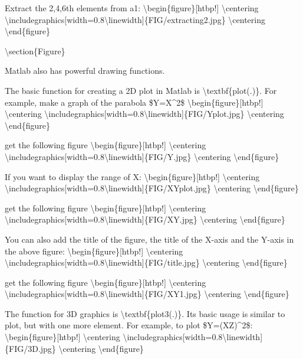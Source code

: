 \documentclass[10pt,math=newtx,citestyle=gb7714-2015,bibstyle=gb7714-2015]{elegantbook}
\begin{document}
	Extract the 2,4,6th elements from a1:
	\textbackslash{}begin\{figure\}[htbp!]
	\textbackslash{}centering
	\textbackslash{}includegraphics[width=0.8\textbackslash{}linewidth]\{FIG/extracting2.jpg\}
	\textbackslash{}centering
	\textbackslash{}end\{figure\}
	
	\textbackslash{}section\{Figure\}
	
	Matlab also has powerful drawing functions.
	
	The basic function for creating a 2D plot in Matlab is \textbackslash{}textbf\{plot(.)\}. For example, make a graph of the parabola \$Y=X\^{}2\$
	\textbackslash{}begin\{figure\}[htbp!]
	\textbackslash{}centering
	\textbackslash{}includegraphics[width=0.8\textbackslash{}linewidth]\{FIG/Yplot.jpg\}
	\textbackslash{}centering
	\textbackslash{}end\{figure\}
	
	get the following figure
	\textbackslash{}begin\{figure\}[htbp!]
	\textbackslash{}centering
	\textbackslash{}includegraphics[width=0.8\textbackslash{}linewidth]\{FIG/Y.jpg\}
	\textbackslash{}centering
	\textbackslash{}end\{figure\}
	
	If you want to display the range of X:
	\textbackslash{}begin\{figure\}[htbp!]
	\textbackslash{}centering
	\textbackslash{}includegraphics[width=0.8\textbackslash{}linewidth]\{FIG/XYplot.jpg\}
	\textbackslash{}centering
	\textbackslash{}end\{figure\}
	
	get the following figure
	\textbackslash{}begin\{figure\}[htbp!]
	\textbackslash{}centering
	\textbackslash{}includegraphics[width=0.8\textbackslash{}linewidth]\{FIG/XY.jpg\}
	\textbackslash{}centering
	\textbackslash{}end\{figure\}
	
	You can also add the title of the figure, the title of the X-axis and the Y-axis in the above figure:
	\textbackslash{}begin\{figure\}[htbp!]
	\textbackslash{}centering
	\textbackslash{}includegraphics[width=0.8\textbackslash{}linewidth]\{FIG/title.jpg\}
	\textbackslash{}centering
	\textbackslash{}end\{figure\}
	
	get the following figure
	\textbackslash{}begin\{figure\}[htbp!]
	\textbackslash{}centering
	\textbackslash{}includegraphics[width=0.8\textbackslash{}linewidth]\{FIG/XY1.jpg\}
	\textbackslash{}centering
	\textbackslash{}end\{figure\}
	
	The function for 3D graphics is \textbackslash{}textbf\{plot3(.)\}. Its basic usage is similar to plot, but with one more element. For example, to plot \$Y=(XZ)\^{}2\$:
	\textbackslash{}begin\{figure\}[htbp!]
	\textbackslash{}centering
	\textbackslash{}includegraphics[width=0.8\textbackslash{}linewidth]\{FIG/3D.jpg\}
	\textbackslash{}centering
	\textbackslash{}end\{figure\}
	
\end{document}
